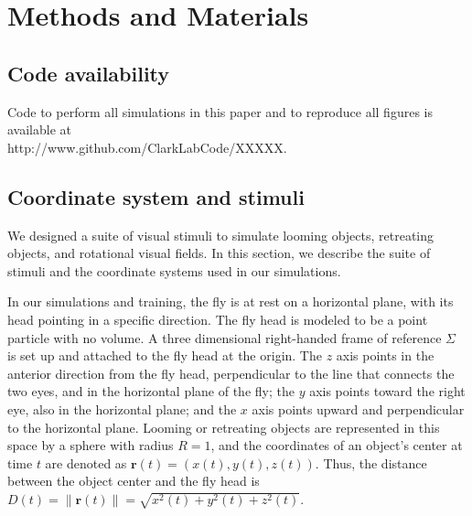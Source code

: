 \documentclass[pdftex,9pt,lineno]{elife}
\begin{document}
\newpage

\section{Methods and Materials}
\label{sec:methods}

\subsection{Code availability}
Code to perform all simulations in this paper and to reproduce all figures is available at \\ http://www.github.com/ClarkLabCode/XXXXX.

\subsection{Coordinate system and stimuli}


We designed a suite of visual stimuli to simulate looming objects, retreating objects, and rotational visual fields. In this section, we describe the suite of stimuli and the coordinate systems used in our simulations.

In our simulations and training, the fly is at rest on a horizontal plane, with its head pointing in a specific direction. The fly head is modeled to be a point particle with no volume. A three dimensional right-handed frame of reference $\Sigma$ is set up and attached to the fly head at the origin. The $z$ axis points in the anterior direction from the fly head, perpendicular to the line that connects the two eyes, and in the horizontal plane of the fly; the $y$ axis points toward the right eye, also in the horizontal plane; and the $x$ axis points upward and perpendicular to the horizontal plane. Looming or retreating objects are represented in this space by a sphere with radius $R=1$, and the coordinates of an object's center at time $t$ are denoted as $\mathbf{r}(t) = (x(t),y(t),z(t))$. Thus, the distance between the object center and the fly head is $D(t) = \|\mathbf{r}(t)\| = \sqrt{x^{2}(t)+y^{2}(t)+z^{2}(t)}$.
\end{document}

